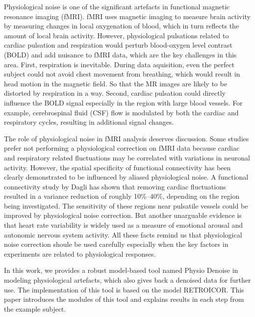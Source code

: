 Physiological noise is one of the significant artefacts in functional magnetic resonance imaging (fMRI).
fMRI uses magnetic imaging to measure brain activity by measuring changes in local oxygenation of blood,
which in turn reflects the amount of local brain activity. \cite{poldrack2011handbook}
However, physiological pulsations related to cardiac pulsation 
and respiration would perturb blood-oxygen level contrast (BOLD) and
add nuisance to fMRI data, 
which are the key challenges in this area. 
First, respiration is inevitable. 
During data aquisition, even the perfect subject could not avoid chest movement from breathing, 
which would result in head motion in the magnetic field. 
So that the MR images are likely to be distorted by respiration in a way.
Second, cardiac pulsation could directly influence the BOLD signal 
especially in the region with large blood vessels. 
For example, cerebrospinal fluid (CSF) flow is modulated 
by both the cardiac and respiratory cycles, resulting in additional signal changes.\cite{birn2012role}

The role of physiological noise in fMRI analysis deserves discussion. 
Some studies prefer not performing a physiological correction on fMRI data because cardiac and respiratory related fluctuations may be correlated with variations in neuronal activity.\cite{birn2012role} 
However, the spatial specificity of functional connectivity has been clearly demonstrated to be influenced by aliased physiological noise.\cite{lowe1998functional}
A functional connectivity study\cite{dagli1999localization} by Dagli has shown that removing cardiac fluctuations resulted in a variance reduction of roughly 10\%–40\%, 
depending on the region being investigated.\cite{dagli1999localization}
The sensitivity of these regions near pulsatile vessels could be improved by physiological noise correction. 
But another unarguable evidence is that heart rate variability is widely used as a measure of emotional arousal and autonomic nervous system activity.\cite{birn2012role} 
All these facts remind us that physiological noise correction shoule be used carefully especially when the key factors in experiments are related to physiological responses.

In this work, we provides a robust model-based tool named Physio Denoise in modeling physiological artefacts, which also gives back a denoised data for further use. 
The implementation of this tool is based on the model RETROICOR.\cite{glover2000image}
This paper introduces the modules of this tool and explains results in each step from the example subject.